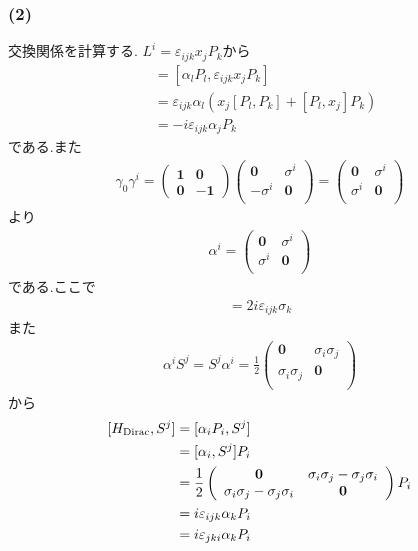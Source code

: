 \documentclass[uplatex,a4j,11pt,dvipdfmx]{jsarticle}
\begin{document}
\subsubsection*{(2)}
交換関係を計算する.
$L^i=\varepsilon_{ijk}x_jP_k$から
\begin{align*}
  [H_{\rm Dirac},L^i]&=[\alpha_lP_l,\varepsilon_{ijk}x_jP_k]\\
  &=\varepsilon_{ijk}\alpha_l\left(x_j[P_l,P_k]+[P_l,x_j]P_k\right)\\
  &=-i\varepsilon_{ijk}\alpha_jP_k
\end{align*}
である.また
\begin{align*}
  \gamma_0\gamma^i=\left(
    \begin{array}{cc}
      {\bm 1}&{\bm 0}\\
      {\bm 0}&-{\bm1}
    \end{array}
  \right)\left(
    \begin{array}{cc}
      {\bm 0}&\sigma^i\\
      -\sigma^i&{\bm 0}\\
    \end{array}
  \right)=\left(
    \begin{array}{cc}
      {\bm 0}&\sigma^i\\
      \sigma^i&{\bm 0}\\
    \end{array}
  \right)
\end{align*}
より
\begin{align*}
  \alpha^i=\left(
    \begin{array}{cc}
      {\bm 0}&\sigma^i\\
      \sigma^i&{\bm 0}\\
    \end{array}
  \right)
\end{align*}
である.ここで
\begin{align*}
  [\sigma_i,\sigma_j]=2i\varepsilon_{ijk}\sigma_k
\end{align*}
また
\begin{align*}
  \alpha^iS^j=S^j\alpha^i=\frac{1}{2}\left(
    \begin{array}{cc}
      {\bm 0}&\sigma_i\sigma_j\\
      \sigma_i\sigma_j&{\bm 0}\\
    \end{array}
  \right)
\end{align*}
から
\begin{align}
  \begin{split}
    [H_{\rm Dirac},S^j]&=[\alpha_iP_i,S^j]\\
    &=[\alpha_i,S^j]P_i\\
    &=\frac{1}{2}\left(
      \begin{array}{cc}
        {\bm 0}&\sigma_i\sigma_j-\sigma_j\sigma_i\\
        \sigma_i\sigma_j-\sigma_j\sigma_i&{\bm 0}\\
      \end{array}
    \right)P_i\\
    &=i\varepsilon_{ijk}\alpha_kP_i\\
    &=i\varepsilon_{jki}\alpha_kP_i
  \end{split}
\end{align}
\end{document}
